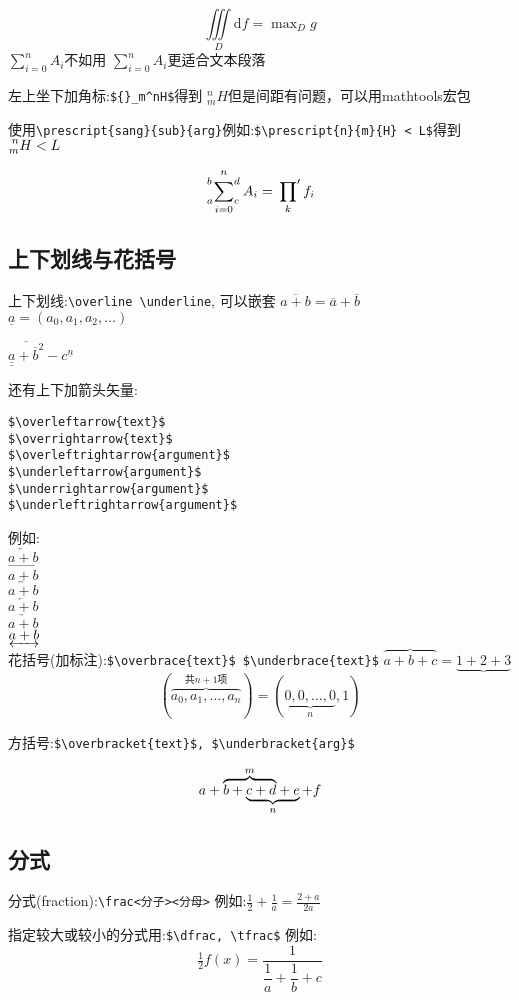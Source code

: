 \documentclass[titlepage, hyperref, UTF8]{ctexart}
\begin{document}
\[
\iiint\limits_D \mathrm{d}f =
\max\nolimits_D g
\]
$\sum\limits_{i=0}^n A_i$不如用
$\sum_{i=0}^n A_i$更适合文本段落

左上坐下加角标:\verb|${}_m^nH$|得到
${}_m^nH$但是间距有问题，可以用mathtools宏包

使用\verb|\prescript{sang}{sub}{arg}|例如:\verb|$\prescript{n}{m}{H} < L$|得到$\prescript{n}{m}{H} < L$

\[
\sideset{_a^b}{_c^d}\sum_{i=0}^n A_i
= \sideset{}{'} \prod_k f_i
\]

\subsection{上下划线与花括号}
上下划线:\verb|\overline \underline|, 可以嵌套
$\overline{a+b} = 
  \overline a + \overline b$\\
$\underline a = (a_0, a_1, a_2, \dots)$

$\overline{\underline{\underline{a}} + \overline{b}^2}
- c^{\underline n}$

还有上下加箭头矢量:
\begin{verbatim}
$\overleftarrow{text}$
$\overrightarrow{text}$
$\overleftrightarrow{argument}$
$\underleftarrow{argument}$
$\underrightarrow{argument}$
$\underleftrightarrow{argument}$
\end{verbatim}
例如:\\
$\overleftarrow{a+b}$\\
$\overrightarrow{a+b}$\\
$\overleftrightarrow{a+b}$\\
$\underleftarrow{a+b}$\\
$\underrightarrow{a+b}$\\
$\underleftrightarrow{a+b}$\\

花括号(加标注):\verb|$\overbrace{text}$ $\underbrace{text}$|
$\overbrace{a+b+c}=\underbrace{1+2+3}$
\[
(\overbrace{a_0, a_1, \dots, a_n}^{\text{共$n+1$项}})
= (\underbrace{0, 0, \dots, 0}_{n}, 1)
\]

方括号:\verb|$\overbracket{text}$, $\underbracket{arg}$|

\[
a+ \rlap{$\overbrace{\phantom{b+c+d}}^m$} b+ \underbrace{c+d+e}_n +f
\]
\subsection{分式}
分式(fraction):\verb|\frac<分子><分母>|
例如:$\frac12 + \frac1a=\frac{2+a}{2a}$

指定较大或较小的分式用:\verb|$\dfrac, \tfrac$|
例如:
\[
\tfrac12f(x) = 
\frac1{\dfrac1a + \dfrac1b + c}
\]
\end{document}
